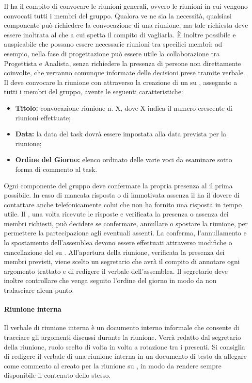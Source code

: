 \documentclass[12pt,a4paper]{article}
\begin{document}
Il \PM{} ha il compito di convocare le riunioni generali, ovvero le riunioni in cui vengono convocati tutti i membri del gruppo.
Qualora ve ne sia la necessità, qualsiasi componente può richiedere la convocazione di una riunione, ma tale richiesta deve essere inoltrata al \PM{} che a cui spetta il compito di vagliarla. È inoltre possibile e auspicabile che possano essere necessarie riunioni tra specifici membri: ad esempio, nella fase di progettazione può essere utile la collaborazione tra Progettista e Analista, senza richiedere la presenza di persone non direttamente coinvolte, che verranno comunque informate delle decisioni prese tramite verbale.
Il \PM{} deve convocare la riunione con attraverso la creazione di un \textit{} su \textit{}, assegnato a tutti i membri del gruppo, avente le seguenti caratteristiche:
\begin{itemize}
  \item \textbf{Titolo:} convocazione riunione n. X, dove X indica il numero crescente di riunioni effettuate;
  \item \textbf{Data:} la data del task dovrà essere impostata alla data prevista per la riunione;
  \item \textbf{Ordine del Giorno:} elenco ordinato delle varie voci da esaminare sotto forma di commento al task.
\end{itemize}
Ogni componente del gruppo deve confermare la propria presenza al \PM{} il prima possibile. 
In caso di mancata risposta o di immotivata assenza il \PM{} ha il dovere di contattare anche telefonicamente colui che non ha fornito una risposta in tempo utile. Il \PM{}, una volta ricevute le risposte e verificata la presenza o assenza dei membri richiesti, può decidere se confermare, annullare o spostare la riunione, per permettere la partecipazione agli eventuali assenti. La conferma, l'annullamento e lo spostamento dell'assemblea devono essere effettuati attraverso modifiche o cancellazione del  su .
All'apertura della riunione, verificata la presenza dei membri previsti, viene scelto un segretario che avrà il compito di annotare ogni argomento trattato e di redigere il verbale dell'assemblea.
Il segretario deve inoltre controllare che venga seguito l'ordine del giorno in modo da non tralasciare alcun punto.

\paragraph{Riunione interna}
Il verbale di riunione interna è un documento interno informale che consente di tracciare gli argomenti discussi durante la riunione. Verrà redatto dal segretario della riunione, ruolo scelto di volta in volta a rotazione tra i presenti. Si consiglia di redigere il verbale di una riunione interna in un documento di testo da allegare come commento al  creato per la riunione su , in modo da rendere sempre disponibile il contenuto dello stesso.
\end{document}

